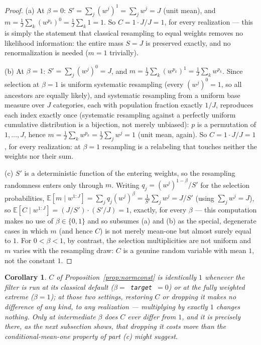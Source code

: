 \documentclass[11pt]{article}
\newtheorem{corollary}{Corollary}
\newcommand{\E}{\mathbb{E}}
\begin{document}
\begin{proof}
(a) At $\beta=0$: $S' = \sum_j (w^j)^1 = \sum_j w^j = J$ (unit mean), and
$m = \frac1J\sum_k (w^{p_k})^0 = \frac1J\sum_k 1 = 1$. So $C = 1\cdot J/J
= 1$, for every realization — this is simply the statement that classical
resampling to equal weights removes no likelihood information: the entire
mass $S=J$ is preserved exactly, and no renormalization is needed ($m=1$
trivially).

(b) At $\beta=1$: $S' = \sum_j (w^j)^0 = J$, and $m = \frac1J\sum_k
(w^{p_k})^1 = \frac1J\sum_k w^{p_k}$. Since selection at $\beta=1$ is uniform
systematic resampling (every $(w^j)^0=1$, so all ancestors are equally
likely), and systematic resampling from a uniform base measure over $J$
categories, each with population fraction exactly $1/J$, reproduces each
index exactly once (systematic resampling against a perfectly uniform
cumulative distribution is a bijection, not merely unbiased): $p$ is a
permutation of $1,\dots,J$, hence $m = \frac1J \sum_k w^{p_k} = \frac1J\sum_j
w^j = 1$ (unit mean, again). So $C = 1\cdot J/J = 1$, for every realization:
at $\beta=1$ resampling is a relabeling that touches neither the weights nor
their sum.

(c) $S'$ is a deterministic function of the entering weights, so the
resampling randomness enters only through $m$. Writing $q_j = (w^j)^{1-\beta}/S'$
for the selection probabilities, $\E[m\mid w^{1:J}] = \sum_j q_j (w^j)^\beta
= \frac1{S'}\sum_j w^j = J/S'$ (using $\sum_j w^j = J$), so $\E[C\mid
w^{1:J}] = (J/S')\cdot(S'/J) = 1$, exactly, for every $\beta$ — this
computation makes no use of $\beta\in\{0,1\}$ and so subsumes (a) and (b) as
the special, degenerate cases in which $m$ (and hence $C$) is not merely
mean-one but almost surely equal to $1$. For $0<\beta<1$, by contrast, the
selection multiplicities are not uniform and $m$ varies with the resampling
draw: $C$ is a genuine random variable with mean $1$, not the constant $1$.
\end{proof}

\begin{corollary}
\label{cor:extremes}
$C$ of Proposition~\ref{prop:normconst} is identically $1$ whenever the filter
is run at its classical default ($\beta=$~\texttt{target}~$=0$) or at the
fully weighted extreme ($\beta=1$); at those two settings, restoring $C$ or
dropping it makes no difference of any kind, to any realization —
multiplying by exactly $1$ changes nothing. Only at intermediate $\beta$
does $C$ ever differ from $1$, and it is precisely there, as the next
subsection shows, that dropping it costs more than the conditional-mean-one
property of part (c) might suggest.
\end{corollary}
\end{document}
